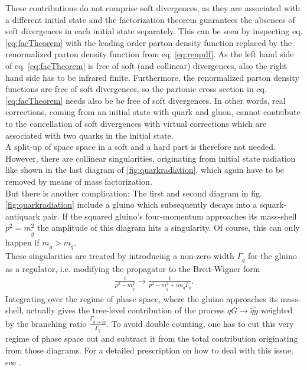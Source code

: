 These contributions do not comprise soft divergences, as they are associated with a different initial state and the factorization theorem guarantees the absences of soft divergences in each initial state separately\cite{dissertori2003quantum}. This can be seen by inspecting eq. \eqref{eq:facTheorem} with the leading order parton density function replaced by the renormalized parton density function from eq. \eqref{eq:renpdf}. As the left hand side of eq. \eqref{eq:facTheorem} is free of soft (and collinear) divergences, also the right hand side has to be infrared finite. Furthermore, the renormalized parton density functions are free of soft divergences, so the partonic cross section in eq. \eqref{eq:facTheorem} needs also be be free of soft divergences. In other words, real corrections, coming from an initial state with quark and gluon, cannot contribute to the cancellation of soft divergences with virtual corrections which are associated with two quarks in the initial state.\\
A split-up of space space in a soft and a hard part is therefore not needed. However, there are collinear singularities, originating from initial state radiation like shown in the last diagram of \ref{fig:quarkradiation}, which again have to be removed by means of mass factorization.\\
But there is another complication: The first and second diagram in fig. \ref{fig:quarkradiation} include a gluino which subsequently decays into a squark-antiquark pair. If the squared gluino's four-momentum approaches its mass-shell $p^2 = m^2_{\tilde{g}}$ the amplitude of this diagram hits a singularity. Of course, this can only happen if $m_{\tilde{g}} > m_{\tilde{q}}$.\\
These singularities are treated by introducing a non-zero width $\Gamma_{\tilde{q}}$ for the gluino as a regulator, i.e. modifying the propagator to the Breit-Wigner form
\begin{align}
\frac{1}{p^2 - m_{\tilde{q}}^2} \to \frac{1}{p^2 - m_{\tilde{q}}^2 + i m_{\tilde{q}} \Gamma_{\tilde{q}}}.
\end{align}
Integrating over the regime of phase space, where the gluino approaches its mass-shell, actually gives the tree-level contribution of the process $qG \to \tilde{q}\tilde{g}$ weighted by the branching ratio $\frac{\Gamma_{\tilde{q}\to q \tilde{g}}}{\Gamma_{\tilde{q}}}$. To avoid double counting, one has to cut this very regime of phase space out and subtract it from the total contribution originating from those diagrams. For a detailed prescription on how to deal with this issue, see \cite{Beenakker:1996ch, Gavin:2013kga}.



\newpage